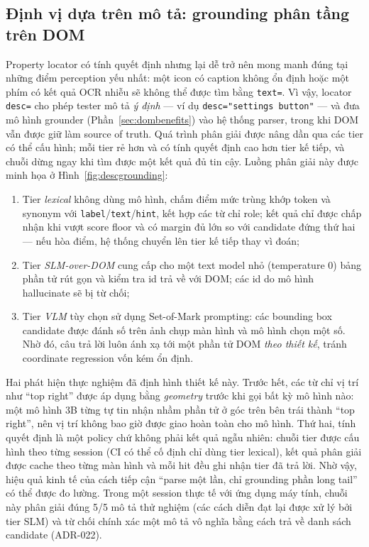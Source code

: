 \documentclass[11pt,a4paper]{article}
\newcommand{\code}[1]{\texttt{#1}}
\begin{document}
\subsection{Định vị dựa trên mô tả: grounding phân tầng trên DOM}
\label{sec:desc}
Property locator có tính quyết định nhưng lại dễ trở nên mong manh đúng tại những
điểm perception yếu nhất: một icon có caption không ổn định hoặc một phím có kết
quả OCR nhiễu sẽ không thể được tìm bằng \code{text=}. Vì vậy, locator
\code{desc=} cho phép tester mô tả \emph{ý định} --- ví dụ
\code{desc="settings button"} --- và đưa mô hình grounder
(Phần~\ref{sec:dombenefits}) vào hệ thống parser, trong khi DOM vẫn được giữ làm
source of truth. Quá trình phân giải được nâng dần qua các tier có thể cấu hình;
mỗi tier rẻ hơn và có tính quyết định cao hơn tier kế tiếp, và chuỗi dừng ngay khi
tìm được một kết quả đủ tin cậy. Luồng phân giải này được minh họa ở
Hình~\ref{fig:descgrounding}:
\begin{enumerate}[leftmargin=1.6em,label=(\roman*)]
  \item Tier \emph{lexical} không dùng mô hình, chấm điểm mức trùng khớp token và
        synonym với \code{label}/\code{text}/\code{hint}, kết hợp các từ chỉ role;
        kết quả chỉ được chấp nhận khi vượt score floor và có margin đủ lớn so với
        candidate đứng thứ hai --- nếu hòa điểm, hệ thống chuyển lên tier kế tiếp
        thay vì đoán;
  \item Tier \emph{SLM-over-DOM} cung cấp cho một text model nhỏ
        (temperature 0) bảng phần tử rút gọn và kiểm tra id trả về với DOM; các id
        do mô hình hallucinate sẽ bị từ chối;
  \item Tier \emph{VLM} tùy chọn sử dụng Set-of-Mark prompting: các bounding box
        candidate được đánh số trên ảnh chụp màn hình và mô hình chọn một số. Nhờ
        đó, câu trả lời luôn ánh xạ tới một phần tử DOM \emph{theo thiết kế}, tránh
        coordinate regression vốn kém ổn định.
\end{enumerate}
Hai phát hiện thực nghiệm đã định hình thiết kế này. Trước hết, các từ chỉ vị trí
như ``top right'' được áp dụng bằng \emph{geometry} trước khi gọi bất kỳ mô hình
nào: một mô hình 3B từng tự tin nhận nhầm phần tử ở góc trên bên trái thành ``top
right'', nên vị trí không bao giờ được giao hoàn toàn cho mô hình. Thứ hai, tính
quyết định là một policy chứ không phải kết quả ngẫu nhiên: chuỗi tier được cấu
hình theo từng session (CI có thể cố định chỉ dùng tier lexical), kết quả phân giải
được cache theo từng màn hình và mỗi hit đều ghi nhận tier đã trả lời. Nhờ vậy,
hiệu quả kinh tế của cách tiếp cận ``parse một lần, chỉ grounding phần long tail''
có thể được đo lường. Trong một session thực tế với ứng dụng máy tính, chuỗi này
phân giải đúng 5/5 mô tả thử nghiệm (các cách diễn đạt lại được xử lý bởi tier SLM)
và từ chối chính xác một mô tả vô nghĩa bằng cách trả về danh sách candidate
(ADR-022).
\end{document}
